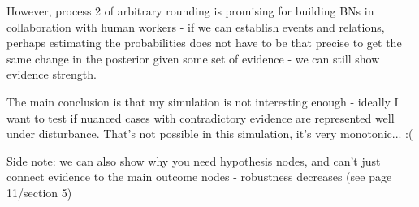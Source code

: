 \documentclass[11pt]{amsart}
\begin{document}
However, process 2 of arbitrary rounding is promising for building BNs in collaboration with human workers - if we can establish events and relations, perhaps estimating the probabilities does not have to be that precise to get the same change in the posterior given some set of evidence - we can still show evidence strength.


The main conclusion is that my simulation is not interesting enough - ideally I want to test if nuanced cases with contradictory evidence are represented well under disturbance. That's not possible in this simulation, it's very monotonic... :(

Side note: we can also show why you need hypothesis nodes, and can't just connect evidence to the main outcome nodes - robustness decreases (see page 11/section 5)

\clearpage
\end{document}
